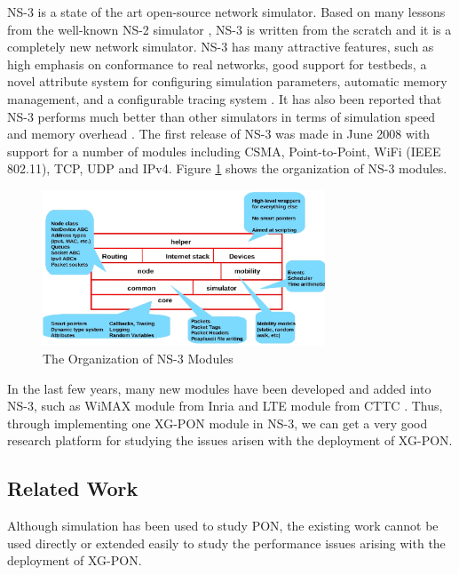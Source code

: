 NS-3 \cite{ns3} is a state of the art open-source network
simulator. Based on many lessons from the well-known NS-2
simulator \cite{ns2}, NS-3 is written from the scratch and it is a
completely new network simulator. NS-3 has many attractive
features, such as high emphasis on conformance to real networks,
good support for testbeds, a novel attribute system for
configuring simulation parameters, automatic memory management,
and a configurable tracing system \cite{henderson08ns3}. It has
also been reported that NS-3 performs much better than other
simulators in terms of simulation speed and memory overhead
\cite{weingartner09NS3Performance}. The first release of NS-3 was
made in June 2008 with support for a number of modules including
CSMA, Point-to-Point, WiFi (IEEE 802.11), TCP, UDP and IPv4.
Figure \ref{fig_ns3components} shows the organization of NS-3
modules.

\begin{figure}[!htbp]
\begin{center}
\includegraphics[width=0.75\textwidth]{images/ns3componnets}
\end{center}
\vspace{-0.1in}
\caption{The Organization of NS-3 Modules}
\label{fig_ns3components}
\end{figure}


In the last few years, many new modules have been developed and
added into NS-3, such as WiMAX module from Inria
\cite{farooq09wimax4ns3} and LTE module from CTTC
\cite{piro11lte4ns3}. Thus, through implementing one XG-PON module
in NS-3, we can get a very good research platform for studying the
issues arisen with the deployment of XG-PON.


\subsection{Related Work}

Although simulation has been used to study PON, the existing work
cannot be used directly or extended easily to study the
performance issues arising with the deployment of XG-PON.

